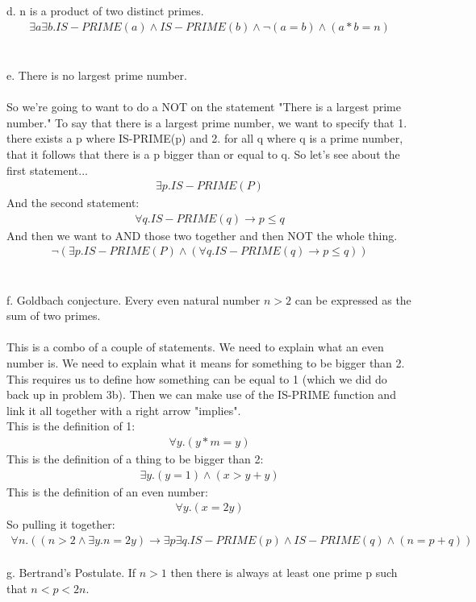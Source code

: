 \documentclass{article}
\begin{document}
\\\\
d. n is a product of two distinct primes.
\begin {align*}
\exists a \exists b. IS-PRIME(a) \wedge IS-PRIME(b) \wedge \neg (a = b) \wedge (a * b = n)
\end {align*}
\\\\
e. There is no largest prime number.
\\\\
So we're going to want to do a NOT on the statement "There is a largest prime number." To say that there is a largest prime number, we want to specify that 1. there exists a p where IS-PRIME(p) and 2. for all q where q is a prime number, that it follows that there is a p bigger than or equal to q. So let's see about the first statement...
\begin {align*}
\exists p. IS-PRIME(P)
\end {align*}
And the second statement:
\begin {align*}
\forall q. IS-PRIME(q) \rightarrow p \leq q
\end {align*}
And then we want to AND those two together and then NOT the whole thing.
\begin {align*}
\neg (\exists p. IS-PRIME(P) \wedge (\forall q. IS-PRIME(q) \rightarrow p \leq q))
\end {align*}
\\\\
f. Goldbach conjecture. Every even natural number $n > 2$ can be expressed as the sum of two primes. 
\\\\
This is a combo of a couple of statements. We need to explain what an even number is. We need to explain what it means for something to be bigger than 2. This requires us to define how something can be equal to 1 (which we did do back up in problem 3b). Then we can make use of the IS-PRIME function and link it all together with a right arrow "implies". 
\\
This is the definition of 1:
\begin {align*}
\forall y. (y*m = y)
\end {align*}
This is the definition of a thing to be bigger than 2:
\begin {align*}
\exists y. (y = 1) \wedge (x > y + y)
\end {align*}
This is the definition of an even number:
\begin {align*}
\forall y. (x = 2y)
\end {align*}
So pulling it together:
\begin {align*}
\forall n. ((n > 2 \wedge \exists y. n = 2y) \rightarrow \exists p \exists q. IS-PRIME(p) \wedge IS-PRIME(q) \wedge (n = p + q))
\end {align*}
\\
g. Bertrand's Postulate. If $n > 1$ then there is always at least one prime p such that $n < p < 2n$.

\\\\
\end{document}
